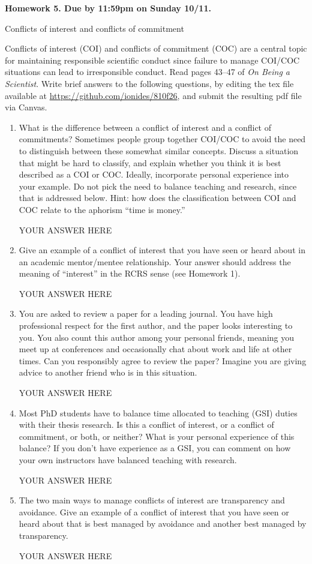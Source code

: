 \documentclass[12pt]{article}
\begin{document}
\begin{center}\bf
Homework 5. Due by 11:59pm on Sunday 10/11.

Conflicts of interest and conflicts of commitment

\end{center}
Conflicts of interest (COI) and conflicts of commitment (COC) are a central topic for maintaining responsible scientific conduct since failure to manage COI/COC situations can lead to irresponsible conduct. Read pages 43--47 of {\em On Being a Scientist}. Write brief answers to the following questions, by editing the tex file available at \url{https://github.com/ionides/810f26}, and submit the resulting pdf file via Canvas.

\begin{enumerate}

\item What is the difference between a conflict of interest and a conflict of commitments? Sometimes people group together COI/COC to avoid the need to distinguish between these somewhat similar concepts. Discuss a situation that might be hard to classify, and explain whether you think it is best described as a COI or COC. Ideally, incorporate personal experience into your example. Do not pick the need to balance teaching and research, since that is addressed below. Hint: how does the classification between COI and COC relate to the aphorism ``time is money.''  

YOUR ANSWER HERE

\item Give an example of a conflict of interest that you have seen or heard about in an academic mentor/mentee relationship. Your answer should address the meaning of ``interest'' in the RCRS sense (see Homework 1).

YOUR ANSWER HERE

\item You are asked to review a paper for a leading journal. You have high professional respect for the first author, and the paper looks interesting to you. You also count this author among your personal friends, meaning you meet up at conferences and occasionally chat about work and life at other times. Can you responsibly agree to review the paper? Imagine you are giving advice to another friend who is in this situation.

YOUR ANSWER HERE

\item Most PhD students have to balance time allocated to teaching (GSI) duties with their thesis research. Is this a conflict of interest, or a conflict of commitment, or both, or neither?
  What is your personal experience of this balance? If you don't have experience as a GSI, you can comment on how your own instructors have balanced teaching with research. 

YOUR ANSWER HERE

\item The two main ways to manage conflicts of interest are transparency and avoidance. Give an example of a conflict of interest that you have seen or heard about that is best managed by avoidance and another best managed by transparency.

YOUR ANSWER HERE

\end{enumerate}
\end{document}
